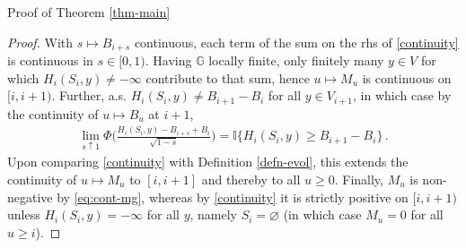 \documentclass[12pt,reqno]{amsart}
\numberwithin{equation}{section}
\theoremstyle{definition}
\begin{document}
\begin{section}{Proof of Theorem \ref{thm-main}}
\begin{proof}
With $s \mapsto B_{i+s}$ continuous, each term of the sum on the {{\sc\lowercase{{rhs}}}} of \eqref{continuity} is continuous in $s \in [0,1)$. Having
${\mathbb{G}}$ locally finite, only finitely many 
$y \in V$ for which $H_i(S_i,y) \ne -\infty$ contribute to 
that sum, hence $u \mapsto M_u$ is continuous on $[i,i+1)$. 
Further, a.s. $H_i(S_i,y) \ne B_{i+1}-B_i$ for all $y \in V_{i+1}$, in which case
by the continuity of $u \mapsto B_u$ at $i+1$,  
\begin{align*}
\lim_{s\uparrow 1} \Phi\Big(\frac{H_i(S_i,y) - B_{i+s} + B_i}{\sqrt{1-s}}\Big)  
= {\mathbb{I}}\{H_i(S_i,y) \ge B_{i+1} - B_i \} \,.
\end{align*}
Upon comparing \eqref{continuity} with Definition \ref{defn-evol}, this extends
the continuity of $u \mapsto M_u$ to $[i,i+1]$ and thereby to all $u \ge 0$.
\newline
{Finally, $M_u$ is non-negative by \eqref{eq:cont-mg},
whereas by \eqref{continuity} it is strictly positive on $[i,i+1)$ unless 
$H_i(S_i,y) = -\infty$ for all $y$, namely $S_i = {\varnothing}$} 
(in which case $M_u=0$ for all $u \ge i$).
\end{proof}


\end{section}
\end{document}
